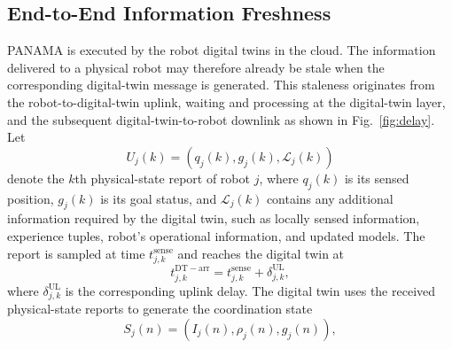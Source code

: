 \IfFileExists{IEEEtran.cls}{\documentclass[conference]{IEEEtran}}{\documentclass[10pt,twocolumn]{article}}
\begin{document}
\subsection{End-to-End Information Freshness} \label{subsec:end_to_end_information_freshness} PANAMA is executed by the robot digital twins in the cloud. The information delivered to a physical robot may therefore already be stale when the corresponding digital-twin message is generated. This staleness originates from the robot-to-digital-twin uplink, waiting and processing at the digital-twin layer, and the subsequent digital-twin-to-robot downlink as shown in Fig.~\ref{fig:delay}. Let \begin{equation} U_j(k) = \left( q_j(k), g_j(k), \mathcal{L}_j(k) \right) \end{equation} denote the \(k\)th physical-state report of robot \(j\), where \(q_j(k)\) is its sensed position, \(g_j(k)\) is its goal status, and \(\mathcal{L}_j(k)\) contains any additional information required by the digital twin, such as locally sensed information, experience tuples, robot's operational information, and updated models. The report is sampled at time \(t_{j,k}^{\mathrm{sense}}\) and reaches the digital twin at 
\begin{equation} t_{j,k}^{\mathrm{DT-arr}} = t_{j,k}^{\mathrm{sense}} + \delta_{j,k}^{\mathrm{UL}}, \label{eq:dt_uplink_arrival} 
\end{equation} 
where \(\delta_{j,k}^{\mathrm{UL}}\) is the corresponding uplink delay. The digital twin uses the received physical-state reports to generate the coordination state 
\begin{equation} S_j(n) = \left( I_j(n), \rho_j(n), g_j(n) \right), \label{eq:coordination_state} 
\end{equation} 
\end{document}

